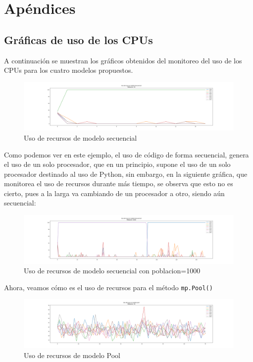 \documentclass[a4paper,twocolumn,10pt]{article}
\begin{document}
\pagebreak


\onecolumn
\section{Apéndices}
\subsection{Gráficas de uso de los CPUs}
A continuación se muestran los gráficos obtenidos del monitoreo del uso de los CPUs para los cuatro modelos propuestos.
\begin{figure}[H]
    \centering
    \includegraphics[width=\linewidth]{Plots/ModeloSecuencial_Poblacion50.png}
    \caption{Uso de recursos de modelo secuencial}
\end{figure}
Como podemos ver en este ejemplo, el uso de código de forma secuencial, genera el uso de un solo procesador, que en un principio, supone el uso de un solo procesador destinado al uso de Python, sin embargo, en la siguiente gráfica, que monitorea el uso de recursos durante más tiempo, se observa que esto no es cierto, pues a la larga va cambiando de un procesador a otro, siendo aún secuencial:
\begin{figure}[H]
    \centering
    \includegraphics[width=\linewidth]{Plots/ModeloSecuencial_Poblacion1000.png}
    \caption{Uso de recursos de modelo secuencial con poblacion=1000}
\end{figure}
Ahora, veamos cómo es el uso de recursos para el método \verb|mp.Pool()|
\begin{figure}[H]
    \centering
    \includegraphics[width=\linewidth]{Plots/Modelopool_Poblacion50.png}
    \caption{Uso de recursos de modelo Pool}
\end{figure}
\end{document}
